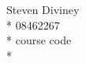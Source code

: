 \documentclass[a4paper,12pt]{article}
\begin{document}
\begin{center}
  {\large Steven Diviney} \\*
    08462267 \\*
      course code \\*
\end{center}
\end{document}
